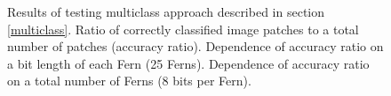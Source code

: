 \documentclass[10pt,twocolumn, a4paper]{article}
\begin{document}
\begin{figure}[t]
    \centering

  \caption{Results of testing multiclass approach described in section \ref{multiclass}.  Ratio of correctly classified image patches to a total number of patches (accuracy ratio). \protect {}  Dependence of accuracy ratio on a bit length of each Fern (25 Ferns).  \protect{} Dependence of accuracy ratio on a total number of Ferns (8 bits per Fern).  }
\label{multires}
\end{figure}
\end{document}
